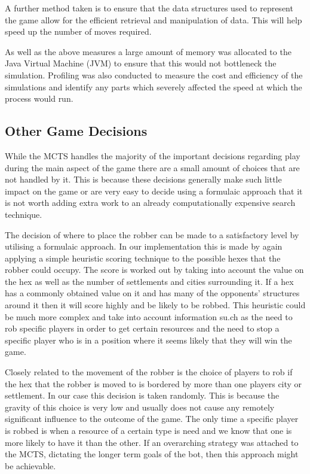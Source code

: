 \documentclass[]{article}
\begin{document}
\par A further method taken is to ensure that the data structures used to represent the game allow for the efficient retrieval and manipulation of data. This will help speed up the number of moves required. 

\par As well as the above measures a large amount of memory was allocated to the Java Virtual Machine (JVM) to ensure that this would not bottleneck the simulation. Profiling was also conducted to measure the cost and efficiency of the simulations and identify any parts which severely affected the speed at which the process would run. 


\subsection{Other Game Decisions}
While the MCTS handles the majority of the important decisions regarding play during the main aspect of the game there are a small amount of choices that are not handled by it. This is because these decisions generally make such little impact on the game or are very easy to decide using a formulaic approach that it is not worth adding extra work to an already computationally expensive search technique.

\par The decision of where to place the robber can be made to a satisfactory level by utilising a formulaic approach. In our implementation this is made by again applying a simple heuristic scoring technique to the possible hexes that the robber could occupy. The score is worked out by taking into account the value on the hex as well as the number of settlements and cities surrounding it. If a hex has a commonly obtained value on it and has many of the opponents' structures around it then it will score highly and be likely to be robbed. This heuristic could be much more complex and take into account information su.ch as the need to rob specific players in order to get certain resources and the need to stop a specific player who is in a position where it seems likely that they will win the game. 

\par Closely related to the movement of the robber is the choice of players to rob if the hex that the robber is moved to is bordered by more than one players city or settlement. In our case this decision is taken randomly. This is because the gravity of this choice is very low and usually does not cause any remotely significant influence to the outcome of the game. The only time a specific player is robbed is when a resource of a certain type is need and we know that one is more likely to have it than the other. If an overarching strategy was attached to the MCTS, dictating the longer term goals of the bot, then this approach might be achievable.
\end{document}
